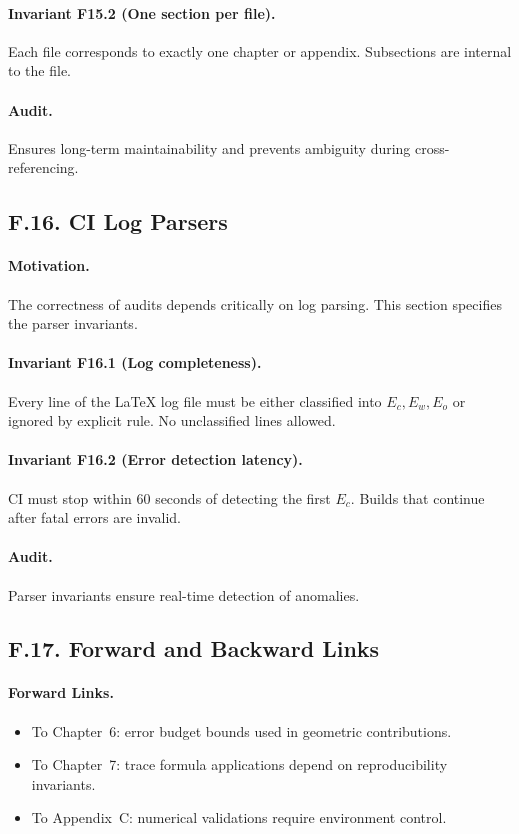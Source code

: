 \paragraph{Invariant F15.2 (One section per file).} Each file corresponds to exactly one chapter or appendix. Subsections are internal to the file.

\paragraph{Audit.} Ensures long-term maintainability and prevents ambiguity during cross-referencing.

\subsection*{F.16. CI Log Parsers}

\paragraph{Motivation.} The correctness of audits depends critically on log parsing. This section specifies the parser invariants.

\paragraph{Invariant F16.1 (Log completeness).} Every line of the LaTeX log file must be either classified into $E_c, E_w, E_o$ or ignored by explicit rule. No unclassified lines allowed.

\paragraph{Invariant F16.2 (Error detection latency).} CI must stop within 60 seconds of detecting the first $E_c$. Builds that continue after fatal errors are invalid.

\paragraph{Audit.} Parser invariants ensure real-time detection of anomalies.

\subsection*{F.17. Forward and Backward Links}

\paragraph{Forward Links.}
\begin{itemize}
    \item To Chapter~6: error budget bounds used in geometric contributions.
    \item To Chapter~7: trace formula applications depend on reproducibility invariants.
    \item To Appendix~C: numerical validations require environment control.
\end{itemize}

